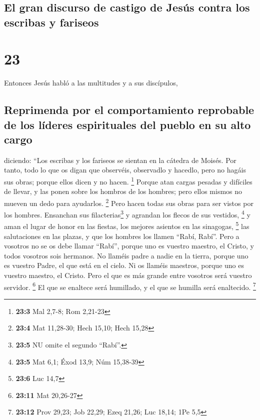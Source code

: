 \hypertarget{el-gran-discurso-de-castigo-de-jesuxfas-contra-los-escribas-y-fariseos}{%
\subsection{El gran discurso de castigo de Jesús contra los escribas y
fariseos}\label{el-gran-discurso-de-castigo-de-jesuxfas-contra-los-escribas-y-fariseos}}

\hypertarget{section-22}{%
\section{23}\label{section-22}}

 Entonces Jesús habló a las multitudes y a sus discípulos,

\hypertarget{reprimenda-por-el-comportamiento-reprobable-de-los-luxedderes-espirituales-del-pueblo-en-su-alto-cargo}{%
\subsection{Reprimenda por el comportamiento reprobable de los líderes
espirituales del pueblo en su alto
cargo}\label{reprimenda-por-el-comportamiento-reprobable-de-los-luxedderes-espirituales-del-pueblo-en-su-alto-cargo}}

 diciendo: ``Los escribas y los fariseos se sientan en la
cátedra de Moisés.  Por tanto, todo lo que os digan que
observéis, observadlo y hacedlo, pero no hagáis sus obras; porque ellos
dicen y no hacen. \footnote{\textbf{23:3} Mal 2,7-8; Rom 2,21-23}
 Porque atan cargas pesadas y difíciles de llevar, y las
ponen sobre los hombros de los hombres; pero ellos mismos no mueven un
dedo para ayudarlos. \footnote{\textbf{23:4} Mat 11,28-30; Hech 15,10;
  Hech 15,28}  Pero hacen todas sus obras para ser vistos
por los hombres. Ensanchan sus filacterias\footnote{\textbf{23:5} NU
  omite el segundo ``Rabí''.} y agrandan los flecos de sus vestidos,
\footnote{\textbf{23:5} Mat 6,1; Éxod 13,9; Núm 15,38-39} 
y aman el lugar de honor en las fiestas, los mejores asientos en las
sinagogas, \footnote{\textbf{23:6} Luc 14,7}  las
salutaciones en las plazas, y que los hombres los llamen ``Rabí, Rabí''.
 Pero a vosotros no se os debe llamar ``Rabí'', porque uno
es vuestro maestro, el Cristo, y todos vosotros sois hermanos.
 No llaméis padre a nadie en la tierra, porque uno es
vuestro Padre, el que está en el cielo.  Ni os llaméis
maestros, porque uno es vuestro maestro, el Cristo.  Pero
el que es más grande entre vosotros será vuestro servidor. \footnote{\textbf{23:11}
  Mat 20,26-27}  El que se enaltece será humillado, y el
que se humilla será enaltecido. \footnote{\textbf{23:12} Prov 29,23; Job
  22,29; Ezeq 21,26; Luc 18,14; 1Pe 5,5}

